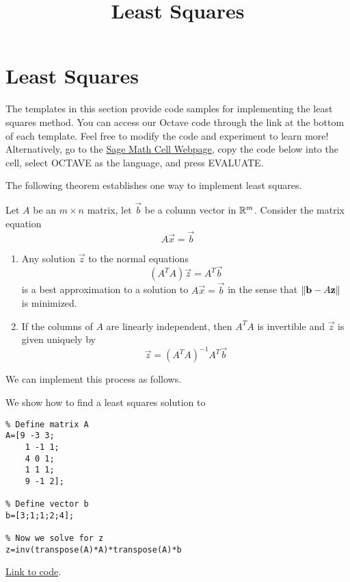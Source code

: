 \documentclass{ximera}
\title{Least Squares} \license{CC BY-NC-SA 4.0}
\begin{document}
\begin{abstract}
\end{abstract}
\maketitle
\section*{Least Squares}

The templates in this section provide code samples for implementing the least squares method. You can access our Octave code through the link at the bottom of each template.  Feel free to modify the code and experiment to learn more!  Alternatively, go to the \href{https://sagecell.sagemath.org/}{Sage Math Cell Webpage}, copy the code below into the cell, select OCTAVE as the language, and press EVALUATE.  


The following theorem establishes one way to implement least squares.

\begin{theorem}[\ref{th:bestApprox}]
    Let $A$ be an $m\times n$ matrix, let $\vec{b}$ be a column vector in $\mathbb{R}^m$.  Consider the matrix equation
    $$A\vec{x}=\vec{b}$$
    \begin{enumerate}
        \item Any solution $\vec{z}$ to the normal equations
        $$\left(A^TA\right)\vec{z}=A^T\vec{b}$$
        is a best approximation to a solution to $A\vec{x}=\vec{b}$ in the sense that $\left\lVert\mathbf{b}-A\mathbf{z}\right\rVert$ is minimized.
        \item If the columns of $A$ are linearly independent, then $A^TA$ is invertible and $\vec{z}$ is given uniquely by
        $$\vec{z}=\left(A^TA\right)^{-1}A^T\vec{b}$$
    \end{enumerate}
    \end{theorem}

We can implement this process as follows.

\begin{template}\label{temp:leastSq}
    We show how to find a least squares solution to 

    \begin{verbatim}
% Define matrix A
A=[9 -3 3;
    1 -1 1;
    4 0 1;
    1 1 1; 
    9 -1 2];
        
% Define vector b
b=[3;1;1;2;4];

% Now we solve for z
z=inv(transpose(A)*A)*transpose(A)*b
    \end{verbatim}

\href{https://sagecell.sagemath.org/?z=eJxTVXBJTcvMS1XITSwpyqxQcOTlcrSNtlTQNVYwtublUgACQwVdQwVDKMdEwQDONgRBawUIxxKkyigWKgUCvFyqMMPLUpNL8osUkni5kmyjja0NgdDI2gSkGKTIL79coTxVoTg_pyxVIQ2oroqXq8o2M69Mo6QoMa-4IL84VcNRUwuIUPhJAN_XLTM=&lang=octave&interacts=eJyLjgUAARUAuQ==}{Link to code}.    
\end{template}
\end{document}

